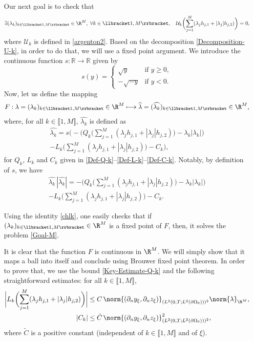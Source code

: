 Our next goal is to check that
\begin{equation}
\label{Goal-M}
\exists (\lambda_{k})_{k \in \llbracket 1,M \rrbracket } \in \R^{M}
,\;\forall k \in \llbracket 1,M \rrbracket,
\quad
\mathcal{U}_k\biggl(
\sum_{j= 1}^M (\lambda_{j} h_{j,1} + |\lambda_{j}| h_{j,2})
\biggr)
= 0,
\end{equation}
where $\mathcal{U}_k$ is defined in \eqref{argenton2}. Based on the decomposition \eqref{Decomposition-U-k}, in order to do that, we will use a fixed point argument. We introduce the continuous function $s:\mathbb R\to \mathbb R$ given by\vspace*{-3pt}
\[
s(y)=\begin{cases}
\sqrt{y}&\text{if }y\geqslant 0,\\
-\sqrt{-y}&\text{if } y<0.
\end{cases}
\]
Now, let us define the mapping
\[
F : \lambda = (\lambda_{k})_{k \in \llbracket 1,M \rrbracket } \in \R^{M} \longmapsto \widehat \lambda = (\widehat{\lambda_{k}})_{k \in \llbracket 1,M \rrbracket } \in \R^{M},
\]
where, for all $k \in \llbracket 1,M \rrbracket $, $\widehat{\lambda_k}$ is defined as
\begin{multline*}
\widehat{\lambda_k}= s \biggl(- \biggl(Q_k\biggl(\sum_{j= 1}^M (\lambda_{j} h_{j,1} + |\lambda_{j}| h_{j,2})\biggr)- \lambda_k |\lambda_k| \biggr)\\[-10pt]
- L_k \biggl(\sum_{j= 1}^M (\lambda_{j} h_{j,1} + |\lambda_{j}| h_{j,2})\biggr)- C_k\biggr),
\end{multline*}
for $Q_k$, $L_k$ and $C_k$ given in \eqref{Def-Q-k}--\eqref{Def-L-k}--\eqref{Def-C-k}. Notably, by definition of $s$, we have
\begin{multline}\label{chlk}
\widehat{\lambda_k}\, |\widehat{\lambda_k}| = - \biggl(Q_k\biggl(\sum_{j= 1}^M (\lambda_{j} h_{j,1} + |\lambda_{j}| h_{j,2})\biggl)- \lambda_k |\lambda_k| \biggr)\\[-5pt]
- L_k \biggl(\sum_{j= 1}^M (\lambda_{j} h_{j,1} + |\lambda_{j}| h_{j,2})\biggr)- C_k.
\end{multline}

Using the identity \eqref{chlk}, one easily checks that if $(\lambda_{k})_{k \in \llbracket 1,M \rrbracket } \in \R^{M} $ is a fixed point of $F$, then, it solves the problem \eqref{Goal-M}.

It is clear that the function $F$ is continuous in $\R^M$. We will simply show that it maps a ball into itself and conclude using Brouwer fixed point theorem. In order to prove that, we use the bound \eqref{Key-Estimate-Q-k} and the following straightforward estimates: for all $k \in \llbracket 1,M \rrbracket $,
\begin{align*}
\biggl| L_k\biggl(
\sum_{j= 1}^M (\lambda_{j} h_{j,1} + |\lambda_{j}| h_{j,2})
\biggr)
\biggr|
&\leq C\, \norm{(\partial_n y_\xi, \partial_n z_\xi)}_{(L^2(0,T; L^2(\partial \Omega_0)))^2} \norm{\lambda}_{\R^M},
\\
| C_k | &\leq \tilde{C}\,\norm{(\partial_n y_\xi, \partial_n z_\xi)}_{(L^2(0,T; L^2(\partial \Omega_0)))^2}^2,
\end{align*}
where {$\tilde{C}$} is a positive constant (independent of $k \in \llbracket 1,M \rrbracket $ and of $\xi$).

